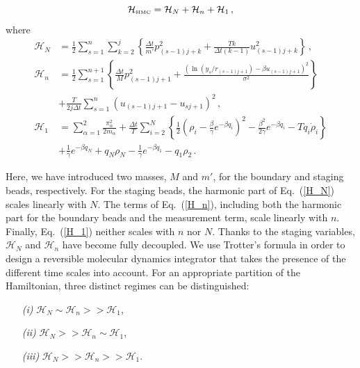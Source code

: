 \documentclass[11pt]{article}
\theoremstyle{definition}
\begin{document}
\begin{equation}
  \mathcal{H}_{\mbox{\tiny HMC}}= \mathcal H_N+\mathcal H_n+\mathcal H_1\,,
\end{equation}
where
\begin{align}
  \mathcal H_N &=
  \frac{1}{2}
  \sum_{s=1}^{n}
  \sum_{k=2}^j
  \left\{
    \frac{\Delta t}{m'}p_{(s-1)j+k}^2
    +
    \frac{Tk}{\Delta t(k-1)}
    u_{(s-1)j+k}^2
  \right\}\,,\label{H_N}
  \\\label{H_n}
  \mathcal H_n &=
  \frac{1}{2}
  \sum_{s=1}^{n+1}
  \left\{
   \frac{\Delta t }{M}p_{(s-1)j+1}^2
    +
    \frac{(\ln(y_s/r_{(s-1)j+1}) - {\beta u_{(s-1)j+1}})^2}{\sigma^2}
   \right\}
   \\\nonumber
  &+
  \frac{T}{2j\Delta t}
  \sum_{s=1}^{n}
    (u_{(s-1)j+1} - u_{sj+1})^2
   \,,
  \\ \label{H_1}
  \mathcal H_1 &=
   \sum_{\alpha=1}^2\frac{\pi_\alpha^2}{2m_\alpha}
   +
  \frac{\Delta t}{T}
   \sum_{i=2}^{N}
   \left\{
    \frac{1}{2}
     \left(
        \rho_i-\frac{\beta}{\gamma}e^{-\beta q_i}
     \right)^2
    -
    \frac{\beta^2}{2\gamma}
    e^{-\beta q_i}
   -
    T q_i\dot\rho_i
   \right\}
  \\\nonumber
  &+
  \frac{1}{\gamma}
  e^{-\beta q_N}
  +
  q_N \rho_{N}
  -
  \frac{1}{\gamma}
  e^{-\beta q_1}
  -
  q_1 \rho_{2} \,.
\end{align}

Here, we have introduced two masses, $M$ and $m'$, for the boundary and staging beads, respectively.
For the staging beads, the harmonic part of Eq.~(\ref{H_N}) scales linearly with $N$. The terms of Eq.~(\ref{H_n}), including both the harmonic part for the boundary beads and the measurement term, scale linearly with $n$. Finally, Eq.~(\ref{H_1}) neither scales with $n$ nor $N$.
Thanks to the staging variables, $\mathcal H_N$ and $\mathcal H_n$ have become fully decoupled.
We use Trotter's formula \cite{tuckerman_1992} in order to design a reversible molecular dynamics integrator that takes the presence of the different time scales into account.
For an appropriate partition of the Hamiltonian, three distinct regimes can be distinguished:

 \begin{enumerate}
   \item[\it (i)]
  $\mathcal H_N \sim \mathcal H_n >> \mathcal H_1$,
  \item[\it (ii)]
  $\mathcal H_N >> \mathcal H_n \sim \mathcal H_1$,
  \item[\it (iii)]
  $\mathcal H_N >> \mathcal H_n >> \mathcal H_1$.
\end{enumerate}
\end{document}
